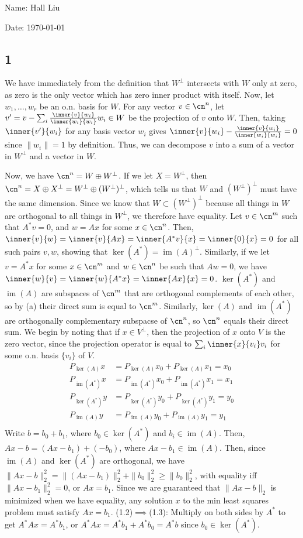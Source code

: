 \documentclass{article}
\DeclareMathOperator{\im}{im}
\begin{document}
Name: Hall Liu

Date: \today 
\vspace{1.5cm}
\subsection*{1}
We have immediately from the definition that $W^\perp$ intersects with $W$ only at zero, as zero is the only vector which has zero inner product with itself. Now, let $w_1,\ldots,w_r$ be an o.n. basis for $W$. For any vector $v\in\cn^n$, let $v'=v-\sum_i\frac{\inner{v}{w_i}}{\inner{w_i}{w_i}}w_i\in W$ be the projection of $v$ onto $W$. Then, taking $\inner{v'}{w_i}$ for any basis vector $w_i$ gives
$\inner{v}{w_i}-\frac{\inner{v}{w_i}}{\inner{w_i}{w_i}}=0$ since $\|w_i\|=1$ by definition. Thus, we can decompose $v$ into a sum of a vector in $W^\perp$ and a vector in $W$.

Now, we have $\cn^n=W\oplus W^\perp$. If we let $X=W^\perp$, then $\cn^n=X\oplus X^\perp=W^\perp\oplus(W^\perp)^\perp$, which tells us that $W$ and $(W^\perp)^\perp$ must have the same dimension. Since we know that $W\subset (W^\perp)^\perp$ because all things in $W$ are orthogonal to all things in $W^\perp$, we therefore have equality.
Let $v\in\cn^m$ such that $A^*v=0$, and $w=Ax$ for some $x\in\cn^n$. Then, $\inner{v}{w}=\inner{v}{Ax}=\inner{A^*v}{x}=\inner{0}{x}=0$ for all such pairs $v,w$, showing that $\ker(A^*)=\im(A)^\perp$. Similarly, if we let $v=A^*x$ for some $x\in\cn^m$ and $w\in\cn^n$ be such that $Aw=0$, we have $\inner{w}{v}=\inner{w}{A^*x}=\inner{Ax}{x}=0$.
$\ker(A^*)$ and $\im(A)$ are subspaces of $\cn^m$ that are orthogonal complements of each other, so by (a) their direct sum is equal to $\cn^m$. Similarly, $\ker(A)$ and $\im(A^*)$ are orthogonally complementary subspacse of $\cn^n$, so $\cn^n$ equals their direct sum.
We begin by noting that if $x\in V^\perp$, then the projection of $x$ onto $V$ is the zero vector, since the projection operator is equal to $\sum_i\inner{x}{v_i}v_i$ for some o.n. basis $\{v_i\}$ of $V$.
\begin{align*}
    P_{\ker(A)}x&=P_{\ker(A)}x_0+P_{\ker(A)}x_1=x_0\\
    P_{\im(A^*)}x&=P_{\im(A^*)}x_0+P_{\im(A^*)}x_1=x_1\\
    P_{\ker(A^*)}y&=P_{\ker(A^*)}y_0+P_{\ker(A^*)}y_1=y_0\\
    P_{\im(A)}y&=P_{\im(A)}y_0+P_{\im(A)}y_1=y_1\\
\end{align*}
Write $b=b_0+b_1$, where $b_0\in\ker(A^*)$ and $b_i\in\im(A)$. Then, $Ax-b=(Ax-b_1)+(-b_0)$, where $Ax-b_1\in\im(A)$. Then, since $\im(A)$ and $\ker(A^*)$ are orthogonal, we have $\|Ax-b\|_2^2=\|(Ax-b_1)\|_2^2+\|b_0\|_2^2\geq\|b_0\|_2^2$, with equality iff $\|Ax-b_1\|_2^2=0$, or $Ax=b_1$. Since we are guaranteed that $\|Ax-b\|_2$ is minimized when we have equality, any solution $x$ to the min least squares problem must satisfy $Ax=b_1$.
(1.2)$\implies$(1.3): Multiply on both sides by $A^*$ to get $A^*Ax=A^*b_1$, or $A^*Ax=A^*b_1+A^*b_0=A^*b$ since $b_0\in\ker(A^*)$.
\end{document}

